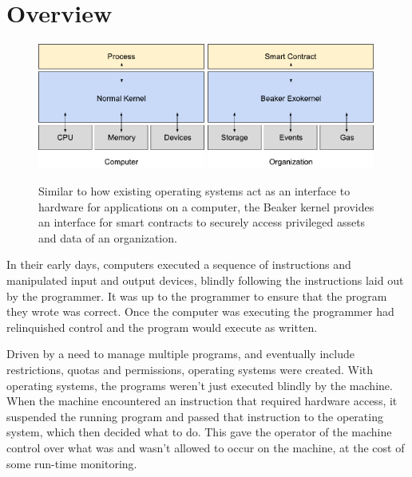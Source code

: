 \documentclass[english,a4paper]{article}
\begin{document}
\section{Overview}\label{overview}
\begin{figure}[H]
    \includegraphics[width=0.49\textwidth]{media/NormalKernelOverview.pdf}
    \includegraphics[width=0.49\textwidth]{media/BeakerKernelOverview.pdf}

    \caption{Similar to how existing operating systems act as an
    interface to hardware for applications on a computer, the Beaker kernel
    provides an interface for smart contracts to securely access privileged
    assets and data of an organization.\label{fig:kernels}}
\end{figure}

In their early days, computers executed a sequence of instructions and
manipulated input and output devices, blindly following the instructions
laid out by the programmer. It was up to the programmer to ensure that
the program they wrote was correct. Once the computer was executing the
programmer had relinquished control and the program would execute as
written.

Driven by a need to manage multiple programs, and eventually include
restrictions, quotas and permissions, operating systems were created.
With operating systems, the programs weren't just executed blindly by
the machine. When the machine encountered an instruction that required
hardware access, it suspended the running program and passed that
instruction to the operating system, which then decided what to do. This
gave the operator of the machine control over what was and wasn't
allowed to occur on the machine, at the cost of some run-time
monitoring.
\end{document}
